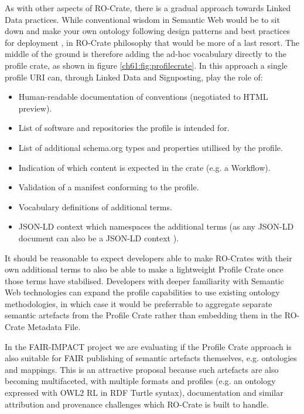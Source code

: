 As with other aspects of RO-Crate, there is a gradual approach towards Linked Data practices. While conventional wisdom in Semantic Web would be to sit down and make your own ontology following design patterns \cite{Blomquist 2009,Poveda 2010} and best practices for deployment \cite{Matentzoglu 2022}, in RO-Crate philosophy that would be more of a last resort. The middle of the ground is therefore adding the ad-hoc vocabulary directly to the profile crate, as shown in figure \vref{ch61:fig:profilecrate}. In this approach a single profile \acrshort{URI} can, through Linked Data and \gls{Signposting}, play the role of:

\begin{itemize}
  \item Human-readable documentation of conventions (negotiated to HTML preview).
  \item List of software and repositories the profile is intended for.
  \item List of additional schema.org types and properties utillised by the profile.
  \item Indication of which content is expected in the crate (e.g. a Workflow).
  \item Validation of a manifest conforming to the profile.
  \item Vocabulary definitions of additional terms.
  \item JSON-LD context which namespaces the additional terms  (as any JSON-LD document can also be a JSON-LD context \cite{Sporny 2020}).
\end{itemize}

It should be reasonable to expect developers able to make RO-Crates with their own additional terms to also be able to make a lightweight Profile Crate once those terms have stabilised. Developers with deeper familiarity with Semantic Web technologies can expand the profile capabilities to use existing ontology methodologies, in which case it would be preferrable to aggregate separate semantic artefacts from the Profile Crate rather than embedding them in the RO-Crate Metadata File.

In the FAIR-IMPACT project we are evaluating if the Profile Crate approach is also suitable for FAIR publishing of semantic artefacts themselves, e.g. ontologies and mappings. This is an attractive proposal because such artefacts are also becoming multifaceted, with multiple formats and profiles (e.g. an ontology expressed with \acrshort{OWL}2 RL in RDF Turtle syntax), documentation and similar attribution and provenance challenges which RO-Crate is built to handle.

